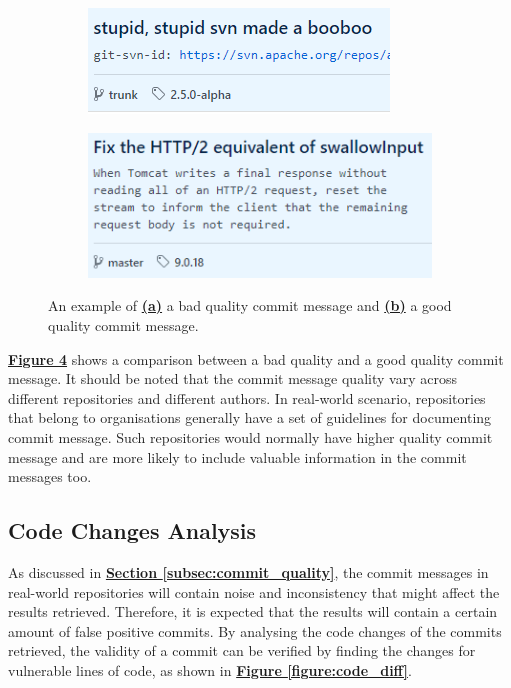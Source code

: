 \documentclass[12pt, a4paper]{report}
\begin{document}
\begin{figure}[H]
  \centering
  \begin{subfigure}{\textwidth}
    \centering
    \includegraphics[width=.55\textwidth]{images/bad_commit_msg.png}
    \label{figure:bad_commit_msg}
  \end{subfigure}%
\end{figure}
\begin{figure}[H]\ContinuedFloat
  \begin{subfigure}{\textwidth}
    \centering
    \includegraphics[width=.55\textwidth]{images/good_commit_msg.png}
    \label{figure:good_commit_msg}
  \end{subfigure}
  \caption[A comparison between a bad quality and a good quality commit message.]%
  {An example of \hyperref[figure:bad_commit_msg]{\textbf{(a)}} a bad quality commit message and
  \hyperref[figure:good_commit_msg]{\textbf{(b)}} a good quality commit message.}
  \label{figure:quality_commit_msg}
\end{figure}

\hyperref[figure:quality_commit_msg]{\textbf{Figure \ref*{figure:quality_commit_msg}}} shows a
comparison between a bad quality and a good quality commit message. It should be noted that the
commit message quality vary across different repositories and different authors. In real-world
scenario, repositories that belong to organisations generally have a set of guidelines for
documenting commit message. Such repositories would normally have higher quality commit message and
are more likely to include valuable information in the commit messages too.

\subsection{Code Changes Analysis}
As discussed in \hyperref[subsec:commit_quality]{\textbf{Section \ref*{subsec:commit_quality}}}, the
commit messages in real-world repositories will contain noise and inconsistency that might affect
the results retrieved. Therefore, it is expected that the results will contain a certain amount of
false positive commits. By analysing the code changes of the commits retrieved, the validity of a
commit can be verified by finding the changes for vulnerable lines of code, as shown in
\hyperref[figure:code_diff]{\textbf{Figure \ref*{figure:code_diff}}}.
\end{document}
